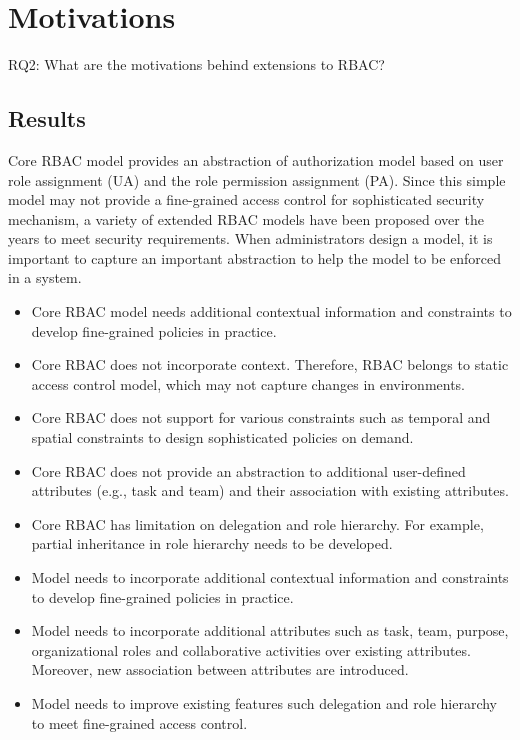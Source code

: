 \section{Motivations} \label{sec:motivations}

RQ2: What are the motivations behind extensions to RBAC?

\subsection{Results}

Core RBAC model provides an abstraction of authorization model based on user role assignment (UA) and the role
permission assignment (PA). Since this simple model may not provide a fine-grained access control for sophisticated
security mechanism, a variety of extended RBAC models have been proposed over the years to meet
security requirements. When administrators design a model, it is important to capture an important abstraction to help the model to be enforced in a system.

\begin{itemize}
\setlength{\itemsep}{0.25pt}
\item Core RBAC model needs additional contextual information and constraints to develop fine-grained policies in practice.
\item Core RBAC does not incorporate context. Therefore, RBAC belongs to static access control model, which may not capture changes in environments.
\item Core RBAC does not support for various constraints such as temporal and spatial constraints to design sophisticated policies on demand.
\item Core RBAC does not provide an abstraction to additional user-defined attributes	(e.g., task and team) and their association with existing attributes.
\item Core RBAC has limitation on delegation and role hierarchy. For example, partial inheritance in role hierarchy needs to be developed.  
\item Model needs to incorporate additional contextual information and constraints to develop fine-grained policies in practice.
\item Model needs to incorporate additional attributes such as
task, team, purpose, organizational roles and collaborative activities over existing attributes. Moreover, new association between attributes
are introduced. 
\item Model needs to improve existing features such delegation and role hierarchy to meet fine-grained access control. 
\end{itemize}

